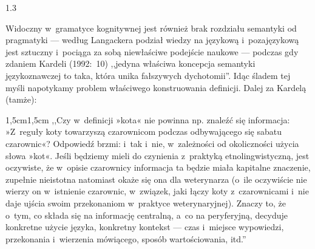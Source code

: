 \documentclass[11pt,a4paper,twoside]{report}
\begin{document}
\begin{spacing}{1.3}



Widoczny w~gramatyce kognitywnej jest również brak rozdziału semantyki od pragmatyki --- według Langackera podział wiedzy na językową i~pozajęzykową jest sztuczny i~pociąga za sobą niewłaściwe podejście naukowe --- podczas gdy zdaniem Kardeli (1992:~10) ,,jedyna właściwa koncepcja semantyki językoznawczej to taka, \linebreak która unika fałszywych dychotomii''. Idąc śladem tej myśli napotykamy problem właściwego konstruowania definicji. Dalej za Kardelą (tamże):
\end{spacing}
\begin{adjustwidth}{1,5cm}{1,5cm}
\small{
,,Czy w~definicji »kota« nie powinna np. znaleźć się informacja: »Z~reguły koty towarzyszą czarownicom podczas odbywającego się sabatu czarownic«? Odpowiedź brzmi: i~tak i~nie, w~zależności od okoliczności użycia słowa »kot«. Jeśli będziemy mieli do czynienia z~praktyką etnolingwistyczną, jest oczywiste, że w~opisie czarownicy informacja ta będzie miała kapitalne znaczenie, zupełnie nieistotna natomiast okaże się ona dla weterynarza (o~ile oczywiście nie wierzy on w~istnienie czarownic, w~związek, jaki łączy koty z~czarownicami i~nie daje ujścia swoim przekonaniom w~praktyce weterynaryjnej). Znaczy to, że o~tym, co składa się na informację centralną, a~co na peryferyjną, decyduje konkretne użycie języka, konkretny kontekst --- czas i~miejsce wypowiedzi, przekonania i~wierzenia mówiącego, sposób wartościowania, itd.''}\\
\end{adjustwidth}
\end{document}
